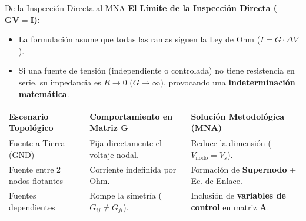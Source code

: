 \documentclass[aspectratio=169, 10pt]{beamer}
\begin{document}
\begin{frame}{De la Inspección Directa al MNA}
    \textbf{El Límite de la Inspección Directa ($\mathbf{G}\mathbf{V} = \mathbf{I}$):}
    \begin{itemize}
        \item La formulación asume que todas las ramas siguen la Ley de Ohm ($I = G \cdot \Delta V$).
        \item Si una fuente de tensión (independiente o controlada) no tiene resistencia en serie, su impedancia es $R \to 0$ ($G \to \infty$), provocando una \textbf{indeterminación matemática}.
    \end{itemize}

    \vspace{0.3cm}
    \begin{table}[]
        \centering
        \footnotesize
        \renewcommand{\arraystretch}{1.4}
        \begin{tabular}{@{}p{3.8cm}p{4cm}p{5.2cm}@{}}
            \toprule
            \rowcolor{ucbblue!10}
            \textbf{Escenario Topológico} & \textbf{Comportamiento en Matriz G} & \textbf{Solución Metodológica (MNA)} \\
            \midrule
            Fuente a Tierra (GND) & Fija directamente el voltaje nodal. & Reduce la dimensión ($V_{\text{nodo}} = V_s$). \\
            Fuente entre 2 nodos flotantes & Corriente indefinida por Ohm. & Formación de \textbf{Supernodo} + Ec. de Enlace. \\
            Fuentes dependientes & Rompe la simetría ($G_{ij} \neq G_{ji}$). & Inclusión de \textbf{variables de control} en matriz $\mathbf{A}$. \\
            \bottomrule
        \end{tabular}
    \end{table}
\end{frame}
\end{document}
